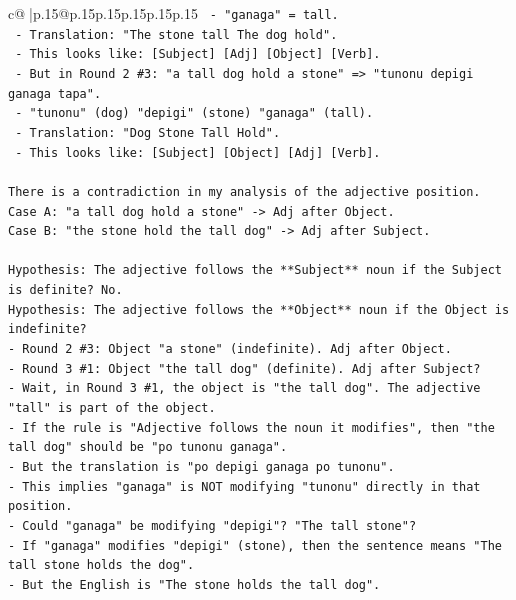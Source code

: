 \documentclass{article}
\begin{document}
{\begin{supertabular}{c@{$\;$}|p{.15\linewidth}@{}p{.15\linewidth}p{.15\linewidth}p{.15\linewidth}p{.15\linewidth}p{.15\linewidth}}
{{{\texttt{  {-} "ganaga" = tall.} \\
\texttt{  {-} Translation: "The stone tall The dog hold".} \\
\texttt{  {-} This looks like: {[}Subject{]} {[}Adj{]} {[}Object{]} {[}Verb{]}.} \\
\texttt{  {-} But in Round 2 \#3: "a tall dog hold a stone" => "tunonu depigi ganaga tapa".} \\
\texttt{  {-} "tunonu" (dog) "depigi" (stone) "ganaga" (tall).} \\
\texttt{  {-} Translation: "Dog Stone Tall Hold".} \\
\texttt{  {-} This looks like: {[}Subject{]} {[}Object{]} {[}Adj{]} {[}Verb{]}.} \\
\\ 
\texttt{There is a contradiction in my analysis of the adjective position.} \\
\texttt{Case A: "a tall dog hold a stone" {-}> Adj after Object.} \\
\texttt{Case B: "the stone hold the tall dog" {-}> Adj after Subject.} \\
\\ 
\texttt{Hypothesis: The adjective follows the **Subject** noun if the Subject is definite? No.} \\
\texttt{Hypothesis: The adjective follows the **Object** noun if the Object is indefinite?} \\
\texttt{{-} Round 2 \#3: Object "a stone" (indefinite). Adj after Object.} \\
\texttt{{-} Round 3 \#1: Object "the tall dog" (definite). Adj after Subject?} \\
\texttt{{-} Wait, in Round 3 \#1, the object is "the tall dog". The adjective "tall" is part of the object.} \\
\texttt{{-} If the rule is "Adjective follows the noun it modifies", then "the tall dog" should be "po tunonu ganaga".} \\
\texttt{{-} But the translation is "po depigi ganaga po tunonu".} \\
\texttt{{-} This implies "ganaga" is NOT modifying "tunonu" directly in that position.} \\
\texttt{{-} Could "ganaga" be modifying "depigi"? "The tall stone"?} \\
\texttt{{-} If "ganaga" modifies "depigi" (stone), then the sentence means "The tall stone holds the dog".} \\
\texttt{{-} But the English is "The stone holds the tall dog".} \\
}}}
\end{supertabular}}
\end{document}
